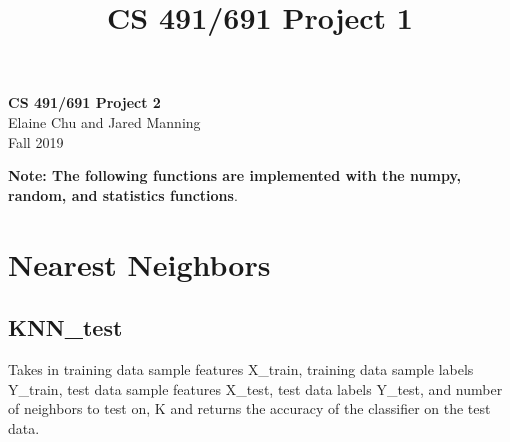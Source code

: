 \documentclass[11pt]{article}
\theoremstyle{definition}
\begin{document}
\setcounter{section}{0}
\title{CS 491/691 Project 1}

\thispagestyle{empty}

\begin{center}
{\LARGE \bf CS 491/691 Project 2}\\
{\large Elaine Chu and Jared Manning}\\
Fall 2019
\end{center}

\textbf{Note: The following functions are implemented with the \textsf{numpy}, \textsf{random}, and \textsf{statistics} functions}.

\section{Nearest Neighbors}
\subsection{KNN\_test}
Takes in training data sample features \textsf{X\_train}, training data sample labels \textsf{Y\_train}, test data sample features \textsf{X\_test}, test data labels \textsf{Y\_test}, and number of neighbors to test on, \textsf{K} and returns the accuracy of the classifier on the test data.
\end{document}
